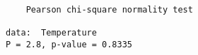 \begin{verbatim} 

	Pearson chi-square normality test

data:  Temperature
P = 2.8, p-value = 0.8335

\end{verbatim}